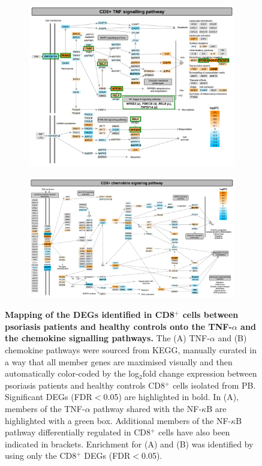 \begin{figure}[htbp]
\centering
\begin{subfigure}{0.8\textwidth}
\centering
\includegraphics[width=\textwidth]{./Results2/pdfs/PS_CTL_CD8_all_TNF_pathway}
\caption{\textbf{}}
\end{subfigure}
\begin{subfigure}{0.8 \textwidth}
\centering
\includegraphics[width=\textwidth]{./Results2/pdfs/PS_CTL_CD8_all_chemokine_pathway}
\caption{\textbf{}}
\end{subfigure}
\caption[Mapping of the DEGs identified in CD8$^+$ cells between psoriasis patients and healthy controls onto the TNF-$\alpha$ and the chemokine signalling pathways.]{\textbf{Mapping of the DEGs identified in CD8$^+$ cells between psoriasis patients and healthy controls onto the TNF-$\alpha$ and the chemokine signalling pathways.} The (A) TNF-$\alpha$ and (B) chemokine pathways were sourced from KEGG, manually curated in a way that all member genes are maximised visually and then automatically color-coded by the log$_2$fold change expression between psoriasis patients and healthy controls CD8$^+$ cells isolated from PB. Significant DEGs (FDR$<$0.05) are highlighted in bold. In (A), members of the TNF-$\alpha$ pathway shared with the NF-$\kappa$B are highlighted with a green box. Additional members of the NF-$\kappa$B pathway differentially regulated in CD8$^+$ cells have also been indicated in brackets. Enrichment for (A) and (B) was identified by using only the CD8$^+$ DEGs (FDR$<$0.05).}

\end{figure}
